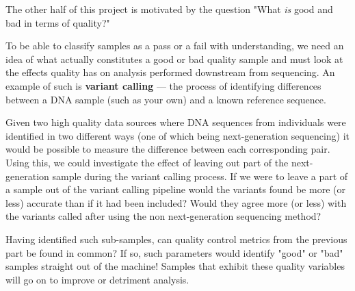 The other half of this project is motivated by the question "What \textit{is}
good and bad in terms of quality?"

To be able to classify samples as a pass or a fail with understanding, we need
an idea of what actually constitutes a good or bad quality sample and must look
at the effects quality has on analysis performed downstream from sequencing.
An example of such is \textbf{variant calling} --- the process of identifying
differences between a DNA sample (such as your own) and a known reference
sequence.

Given two high quality data sources where DNA sequences from individuals were
identified in two different ways (one of which being next-generation sequencing)
it would be possible to measure the difference between each corresponding pair.
Using this, we could investigate the effect of leaving out part of the
next-generation sample during the variant calling process.
If we were to leave a part of a sample out of the variant calling
pipeline would the variants found be more (or less) accurate than if it had been
included? Would they agree more (or less) with the variants called after using
the non next-generation sequencing method?

Having identified such sub-samples, can quality control metrics from the
previous part be found in common? If so, such parameters would identify "good"
or "bad" samples straight out of the machine! Samples that exhibit these quality
variables will go on to improve or detriment analysis.


